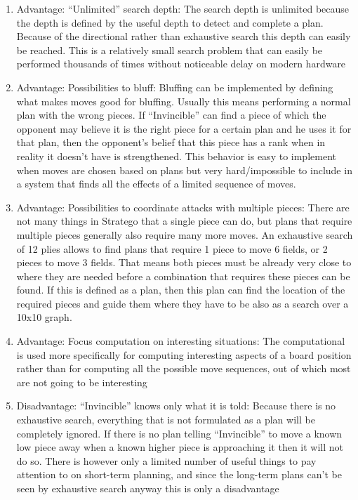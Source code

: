 \documentclass{article}
\begin{document}
\begin{enumerate}
  \item Advantage: “Unlimited” search depth: The search depth is unlimited because the depth is defined by the useful depth to detect and complete a plan. 
  Because of the directional rather than exhaustive search this depth can easily be reached. 
  This is a relatively small search problem that can easily be performed thousands of times without noticeable delay on modern hardware 
  \item Advantage: Possibilities to bluff: Bluffing can be implemented by defining what makes moves good for bluffing. Usually this means performing a normal plan with the wrong pieces. 
  If “Invincible” can find a piece of which the opponent may believe it is the right piece for a certain plan and he uses it for that plan, then the opponent's belief that this piece has a rank when in reality it doesn’t have is strengthened. 
  This behavior is easy to implement when moves are chosen based on plans but very hard/impossible to include in a system that finds all the effects of a limited sequence of moves. 
  \item Advantage: Possibilities to coordinate attacks with multiple pieces: 
  There are not many things in Stratego that a single piece can do, but plans that require multiple pieces generally also require many more moves. 
  An exhaustive search of 12 plies allows to find plans that require 1 piece to move 6 fields, or 2 pieces to move 3 fields. 
  That means both pieces must be already very close to where they are needed before a combination that requires these pieces can be found. 
  If this is defined as a plan, then this plan can find the location of the required pieces and guide them where they have to be also as a search over a 10x10 graph. 
  \item Advantage: Focus computation on interesting situations: 
  The computational is used more specifically for computing interesting aspects of a board position rather than for computing all the possible move sequences, out of which most are not going to be interesting 
  \item Disadvantage: “Invincible” knows only what it is told: Because there is no exhaustive search, everything that is not formulated as a plan will be completely ignored. 
  If there is no plan telling “Invincible” to move a known low piece away when a known higher piece is approaching it then it will not do so. 
  There is however only a limited number of useful things to pay attention to on short-term planning, and since the long-term plans can’t be seen by exhaustive search anyway this is only a disadvantage 

\end{enumerate}
\end{document}
